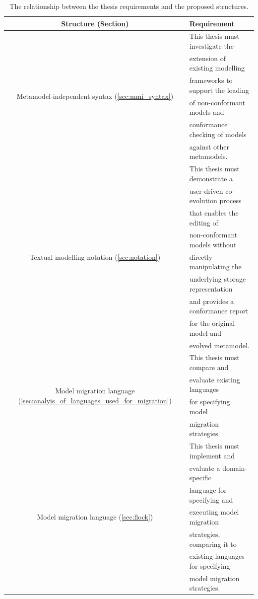 \begin{table}[tbhp]
	\centering
	\begin{tabular}{|c|l|}
		\hline
		\textbf{Structure (Section)} & \textbf{Requirement} \\
		\hline
		\multirow{6}{*}{Metamodel-independent syntax (\ref{sec:mmi_syntax})} & This thesis must investigate the \\
		& extension of existing modelling \\ 
		& frameworks to support the loading \\
		& of non-conformant models and \\
		& conformance checking of models \\
		& against other metamodels. \\
		\hline
		\multirow{9}{*}{Textual modelling notation (\ref{sec:notation})} & This thesis must demonstrate a \\
		& user-driven co-evolution process \\
		& that enables the editing of \\
		& non-conformant models without \\
		& directly manipulating the \\
		& underlying storage representation \\
		& and provides a conformance report \\
		& for the original model and \\
		& evolved metamodel. \\
		\hline
		\multirow{4}{*}{Model migration language (\ref{sec:analyis_of_languages_used_for_migration})} & This thesis must compare and \\
    & evaluate existing languages \\
		& for specifying model   \\
		& migration strategies.  \\
		\hline
		\multirow{7}{*}{Model migration language (\ref{sec:flock})} & This thesis must implement and \\
		& evaluate a domain-specific \\
		& language for specifying and \\
		& executing model migration \\
		& strategies, comparing it to \\
		& existing languages for specifying \\ 
		& model migration strategies. \\
		\hline
	\end{tabular}
	\label{tab:implementation_to_requirements}
	\caption{The relationship between the thesis requirements and the proposed structures.}
\end{table}

